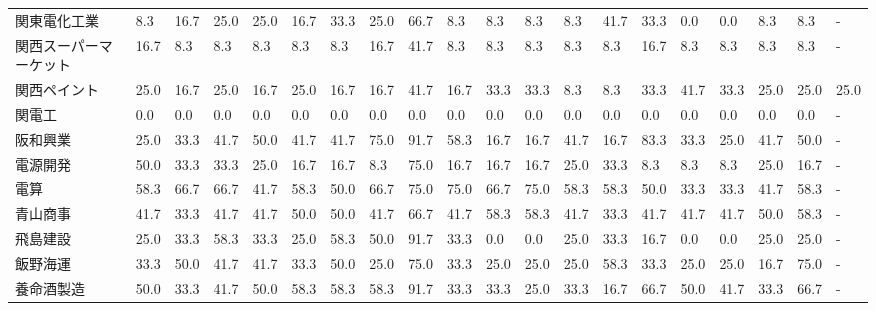 \documentclass[a4paper，11pt]{jsarticle}
\begin{document}
\begin{longtable}[c]{lp{3mm}p{3mm}p{3mm}p{3mm}p{3mm}p{3mm}p{3mm}p{3mm}p{3mm}p{3mm}p{3mm}p{3mm}p{3mm}p{3mm}p{3mm}p{3mm}p{3mm}p{3mm}p{3mm}}
関東電化工業          &    8.3 &   16.7 &      25.0 &      25.0 &       16.7 &   33.3 &   25.0 &   66.7 &     8.3 &     8.3 &    8.3 &   8.3 &   41.7 &    33.3 &     0.0 &   0.0 &   8.3 &   8.3 &     - \\
関西スーパーマーケット     &   16.7 &    8.3 &       8.3 &       8.3 &        8.3 &    8.3 &   16.7 &   41.7 &     8.3 &     8.3 &    8.3 &   8.3 &    8.3 &    16.7 &     8.3 &   8.3 &   8.3 &   8.3 &     - \\
関西ペイント          &   25.0 &   16.7 &      25.0 &      16.7 &       25.0 &   16.7 &   16.7 &   41.7 &    16.7 &    33.3 &   33.3 &   8.3 &    8.3 &    33.3 &    41.7 &  33.3 &  25.0 &  25.0 &  25.0 \\
関電工             &    0.0 &    0.0 &       0.0 &       0.0 &        0.0 &    0.0 &    0.0 &    0.0 &     0.0 &     0.0 &    0.0 &   0.0 &    0.0 &     0.0 &     0.0 &   0.0 &   0.0 &   0.0 &     - \\
阪和興業            &   25.0 &   33.3 &      41.7 &      50.0 &       41.7 &   41.7 &   75.0 &   91.7 &    58.3 &    16.7 &   16.7 &  41.7 &   16.7 &    83.3 &    33.3 &  25.0 &  41.7 &  50.0 &     - \\
電源開発            &   50.0 &   33.3 &      33.3 &      25.0 &       16.7 &   16.7 &    8.3 &   75.0 &    16.7 &    16.7 &   16.7 &  25.0 &   33.3 &     8.3 &     8.3 &   8.3 &  25.0 &  16.7 &     - \\
電算              &   58.3 &   66.7 &      66.7 &      41.7 &       58.3 &   50.0 &   66.7 &   75.0 &    75.0 &    66.7 &   75.0 &  58.3 &   58.3 &    50.0 &    33.3 &  33.3 &  41.7 &  58.3 &     - \\
青山商事            &   41.7 &   33.3 &      41.7 &      41.7 &       50.0 &   50.0 &   41.7 &   66.7 &    41.7 &    58.3 &   58.3 &  41.7 &   33.3 &    41.7 &    41.7 &  41.7 &  50.0 &  58.3 &     - \\
飛島建設            &   25.0 &   33.3 &      58.3 &      33.3 &       25.0 &   58.3 &   50.0 &   91.7 &    33.3 &     0.0 &    0.0 &  25.0 &   33.3 &    16.7 &     0.0 &   0.0 &  25.0 &  25.0 &     - \\
飯野海運            &   33.3 &   50.0 &      41.7 &      41.7 &       33.3 &   50.0 &   25.0 &   75.0 &    33.3 &    25.0 &   25.0 &  25.0 &   58.3 &    33.3 &    25.0 &  25.0 &  16.7 &  75.0 &     - \\
養命酒製造           &   50.0 &   33.3 &      41.7 &      50.0 &       58.3 &   58.3 &   58.3 &   91.7 &    33.3 &    33.3 &   25.0 &  33.3 &   16.7 &    66.7 &    50.0 &  41.7 &  33.3 &  66.7 &     - \\

\end{longtable}
\end{document}
